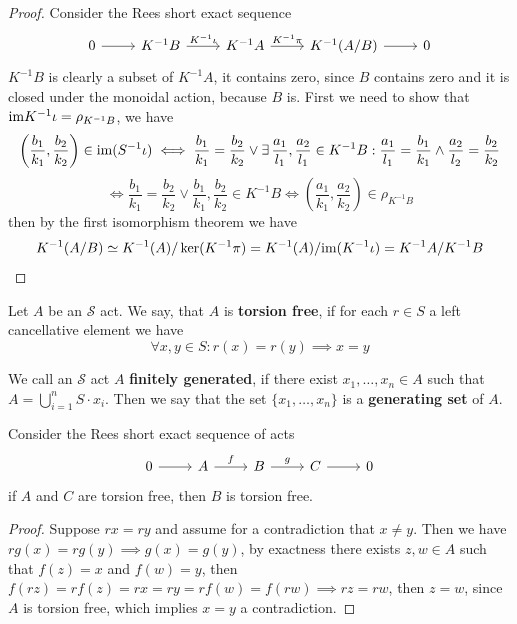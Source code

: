 \begin{proof}[Proof]
    Consider the Rees short exact sequence 
    \[\begin{tikzcd}
        0 & {K^{-1}B} & {K^{-1}A} & {K^{-1}(A/B)} & 0
        \arrow[from=1-1, to=1-2]
        \arrow["{K^{-1}\iota}", from=1-2, to=1-3]
        \arrow["{K^{-1}\pi}", from=1-3, to=1-4]
        \arrow[from=1-4, to=1-5]
    \end{tikzcd}\]
    $K^{-1}B$ is clearly a subset of $K^{-1}A$, it contains zero, since $B$ contains zero and 
    it is closed under the monoidal action, because $B$ is.
    First we need to show that $\text{im} K^{-1}\iota = \rho_{K^{-1}B}$, we have 
    \[
    \left(\frac{b_1}{k_1},\frac{b_2}{k_2}\right)\in\text{im}(S^{-1}\iota) \iff \frac{b_1}{k_1}=\frac{b_2}{k_2}\lor\exists\,\frac{a_1}{l_1},\frac{a_2}{l_1}\in K^{-1}B :
    \frac{a_1}{l_1}=\frac{b_1}{k_1}\land\frac{a_2}{l_2}=\frac{b_2}{k_2}
    \]
    \[
        \iff \frac{b_1}{k_1}=\frac{b_2}{k_2}\lor \frac{b_1}{k_1},\frac{b_2}{k_2}\in K^{-1}B \iff \left(\frac{a_1}{k_1},\frac{a_2}{k_2}\right)\in\rho_{K^{-1}B}
    \]
    then by the first isomorphism theorem we have 
    \[
    K^{-1}(A/B)\simeq K^{-1}(A)/\ker(K^{-1}\pi) = K^{-1}(A)/\text{im}(K^{-1}\iota) = K^{-1}A/K^{-1}B
    \]
\end{proof}
\begin{definition}
    Let $A$ be an $\mathcal{S}$ act. We say, that $A$ is \textbf{torsion free}, if 
    for each $r\in S$ a left cancellative element we have 
    \[
        \forall x,y\in S : r(x)=r(y) \implies x=y
    \]
\end{definition}
\begin{definition}
    We call an $\mathcal{S}$ act $A$ \textbf{finitely generated}, if there exist 
    $x_1,\dots,x_n\in A$ such that $A = \bigcup_{i=1}^n S\cdot x_i$. Then we say 
    that the set $\{x_1,\dots,x_n\}$ is a \textbf{generating set} of $A$.
\end{definition}
\begin{proposition}
    Consider the Rees short exact sequence of acts 
    \[\begin{tikzcd}
        0 & A & B & C & 0
        \arrow[from=1-1, to=1-2]
        \arrow["f", from=1-2, to=1-3]
        \arrow["g", from=1-3, to=1-4]
        \arrow[from=1-4, to=1-5]
    \end{tikzcd}\]
    if $A$ and $C$ are torsion free, then $B$ is torsion free.
\end{proposition}
\begin{proof}[Proof]
    Suppose $rx=ry$ and assume for a contradiction that $x\neq y$. Then we have 
    $rg(x)=rg(y) \implies g(x)=g(y)$, by exactness there exists $z,w\in A$ such that 
    $f(z)=x$ and $f(w)=y$, then $f(rz)=rf(z)=rx=ry=rf(w)=f(rw) \implies rz=rw$, then 
    $z=w$, since $A$ is torsion free, which implies $x=y$ a contradiction.
\end{proof}
